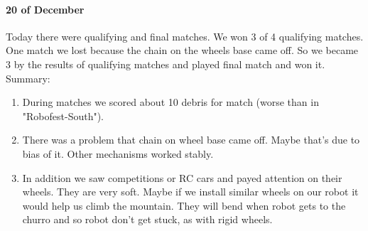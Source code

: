 \paragraph{20 of December}
Today there were qualifying and final matches.\newline
We won 3 of 4 qualifying matches. One match we lost because the chain on the wheels base came off. So we became 3 by the results of qualifying matches and played final match and won it.\newline
Summary:
\begin{enumerate}
	\item During matches we scored about 10 debris for match (worse than in "Robofest-South").
	
	\item There was a problem that chain on wheel base came off. Maybe that's due to bias of it. Other mechanisms worked stably.
	
	\item In addition we saw competitions or RC cars and payed attention on their wheels. They are very soft. Maybe if we install similar wheels on our robot it would help us climb the mountain. They will bend when robot gets to the churro and so robot don't get stuck, as with rigid wheels.  
\end{enumerate}
\fillpage
